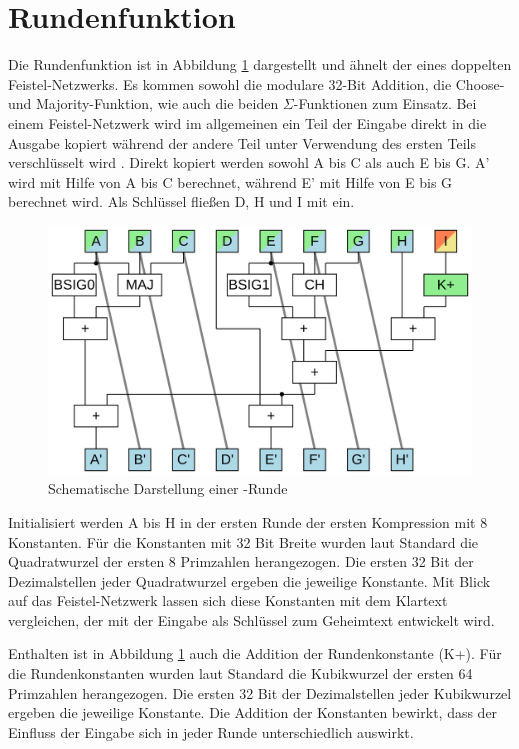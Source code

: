 \section{Rundenfunktion}
\label{sec:sha256:runde}

Die Rundenfunktion ist in Abbildung \ref{fig:sha256core} dargestellt und ähnelt der eines doppelten Feistel-Netzwerks.
Es kommen sowohl die modulare 32-Bit Addition, die Choose- und Majority-Funktion, wie auch die beiden $\Sigma$-Funktionen zum Einsatz.
Bei einem Feistel-Netzwerk wird im allgemeinen ein Teil der Eingabe direkt in die Ausgabe kopiert während der andere
Teil unter Verwendung des ersten Teils verschlüsselt wird \cite[311]{crypto1}. Direkt kopiert werden sowohl A bis C
als auch E bis G. A' wird mit Hilfe von A bis C berechnet, während E' mit Hilfe von E bis G berechnet wird.
Als Schlüssel fließen D, H und I mit ein.

\begin{figure}[!h]
  \centering
  \includegraphics[scale=0.4]{images/sha256core}
  \caption{Schematische Darstellung einer -Runde}
  \label{fig:sha256core}
\end{figure}

Initialisiert werden A bis H in der ersten Runde der ersten Kompression mit 8 Konstanten. Für die Konstanten mit 32 Bit Breite wurden laut
Standard \cite[10]{nist1804} die Quadratwurzel der ersten 8 Primzahlen herangezogen. Die ersten 32 Bit der Dezimalstellen jeder Quadratwurzel
ergeben die jeweilige Konstante. Mit Blick auf das Feistel-Netzwerk lassen sich diese Konstanten mit dem Klartext vergleichen, der mit der
Eingabe als Schlüssel zum Geheimtext entwickelt wird.

Enthalten ist in Abbildung \ref{fig:sha256core} auch die Addition der Rundenkonstante (K+). Für die Rundenkonstanten wurden laut Standard
\cite[10]{nist1804} die Kubikwurzel der ersten 64 Primzahlen herangezogen. Die ersten 32 Bit der Dezimalstellen jeder Kubikwurzel ergeben
die jeweilige Konstante. Die Addition der Konstanten bewirkt, dass der Einfluss der Eingabe sich in jeder Runde unterschiedlich auswirkt.